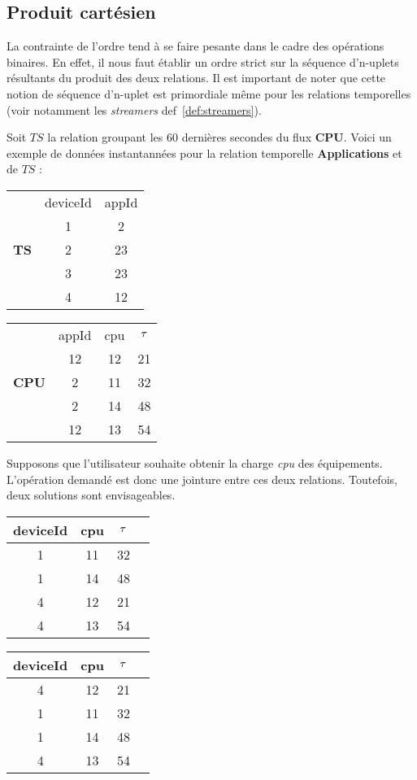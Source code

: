 \subsection{Produit cartésien}
La contrainte de l'ordre tend à se faire pesante dans le cadre des opérations binaires. En effet, il nous faut établir un ordre strict sur la séquence d'n-uplets résultants du produit des deux relations. Il est important de noter que cette notion de séquence d'n-uplet est primordiale même pour les relations temporelles (voir notamment les \textit{streamers} def~\ref{def:streamers}).
\begin{example}\label{ex:asymetrie}
Soit $TS$ la relation groupant les 60 dernières secondes du flux \textbf{CPU}. Voici un exemple de données instantannées pour la relation temporelle \textbf{Applications} et de $TS$ :
\begin{center}
\begin{tabular}{ccc}
& deviceId & appId \\ %
\cline{2-3} & 1 & 2 \\
\textbf{TS} &2 & 23 \\
&3 & 23 \\
&4 & 12 \\
\end{tabular} \quad \quad \quad
\begin{tabular}{cccc}
& appId & cpu & $\tau$ \\%
\cline{2-4} & 12 & 12 & 21 \\
\textbf{CPU}& 2 & 11 & 32 \\
& 2 & 14 & 48 \\
&12& 13 & 54 \\
\end{tabular}
\end{center}

Supposons que l'utilisateur souhaite obtenir la charge \textit{cpu} des équipements. L'opération demandé est donc une jointure entre ces deux relations. Toutefois, deux solutions sont envisageables.
\begin{center}
\begin{tabular}{cccc} 
        deviceId & cpu & $\tau$ \\ \hline 
        1&  11&  32  \\
        1&  14&  48  \\
        4&  12&  21 \\
        4&  13&  54\\
\end{tabular}
\quad \quad \quad
\begin{tabular}{cccc}
        deviceId & cpu & $\tau$ \\ \hline 
        4&  12&  21\\
        1&  11&  32\\
        1&  14&  48\\
        4&  13&  54\\
\end{tabular}
\end{center}


\end{example}
